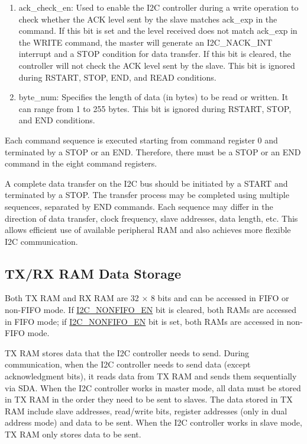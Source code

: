 \documentclass[main\_\_EN.tex]{subfiles}
\begin{document}
\begin{enumerate}
\item ack\_check\_en: Used to enable the I2C controller during a write operation to check whether the ACK level sent by the slave matches ack\_exp in the command. If this bit is set and the level received does not match ack\_exp in the WRITE command, the master will generate an I2C\_NACK\_INT interrupt and a STOP condition for data transfer. If this bit is cleared, the controller will not check the ACK level sent by the slave. This bit is ignored during RSTART, STOP, END, and READ conditions.

\item byte\_num: Specifies the length of data (in bytes) to be read or written. It can range from 1 to 255 bytes. This bit is ignored during RSTART, STOP, and END conditions.

\end{enumerate}

Each command sequence is executed starting from command register 0 and terminated by a STOP or an END. Therefore, there must be a STOP or an END command in the eight command registers.

A complete data transfer on the I2C bus should be initiated by a START and terminated by a STOP. The transfer process may be completed using multiple sequences, separated by END commands. Each sequence may differ in the direction of data transfer, clock frequency, slave addresses, data length, etc. This allows efficient use of available peripheral RAM and also achieves more flexible I2C communication.

\subsection{TX/RX RAM Data Storage}\label{subsubsec:i2c-txrx}
Both TX RAM and RX RAM are 32 × 8 bits and can be accessed in FIFO or non-FIFO mode. If \hyperref[fielddesc:I2CNONFIFOEN]{I2C\_NONFIFO\_EN} bit is cleared, both RAMs are accessed in FIFO mode; if \hyperref[fielddesc:I2CNONFIFOEN]{I2C\_NONFIFO\_EN} bit is set, both RAMs are accessed in non-FIFO mode.

TX RAM stores data that the I2C controller needs to send. During communication, when the I2C controller needs to send data (except acknowledgment bits), it reads data from TX RAM and sends them sequentially via SDA. When the I2C controller works in master mode, all data must be stored in TX RAM in the order they need to be sent to slaves. The data stored in TX RAM include slave addresses, read/write bits, register addresses (only in dual address mode) and data to be sent. When the I2C controller works in slave mode, TX RAM only stores data to be sent.
\end{document}
